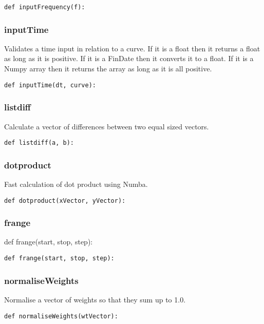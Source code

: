 \documentclass[twoside,11pt]{book}
\begin{document}
\begin{lstlisting}
def inputFrequency(f):
\end{lstlisting}

\subsubsection*{{\bf inputTime}}
Validates a time input in relation to a curve. If it is a float then it returns a float as long as it is positive. If it is a FinDate then it converts it to a float. If it is a Numpy array then it returns the array as long as it is all positive.  

\begin{lstlisting}
def inputTime(dt, curve):
\end{lstlisting}

\subsubsection*{{\bf listdiff}}
Calculate a vector of differences between two equal sized vectors.  

\begin{lstlisting}
def listdiff(a, b):
\end{lstlisting}

\subsubsection*{{\bf dotproduct}}
Fast calculation of dot product using Numba.  

\begin{lstlisting}
def dotproduct(xVector, yVector):
\end{lstlisting}

\subsubsection*{{\bf frange}}
def frange(start, stop, step): 

\begin{lstlisting}
def frange(start, stop, step):
\end{lstlisting}

\subsubsection*{{\bf normaliseWeights}}
Normalise a vector of weights so that they sum up to 1.0.  

\begin{lstlisting}
def normaliseWeights(wtVector):
\end{lstlisting}
\end{document}
